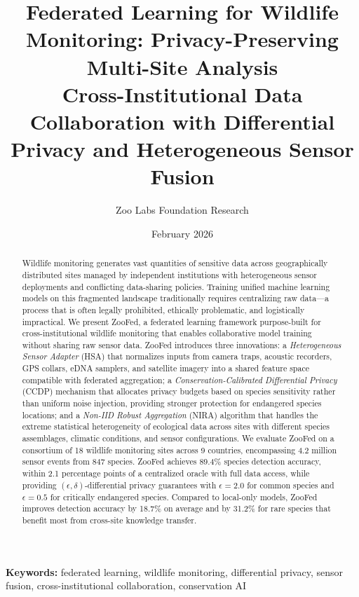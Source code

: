 \documentclass[11pt,a4paper]{article}
\title{\textbf{Federated Learning for Wildlife Monitoring: Privacy-Preserving Multi-Site Analysis} \\[0.5em]
\large Cross-Institutional Data Collaboration with Differential Privacy and Heterogeneous Sensor Fusion}
\author[1]{Zoo Labs Foundation Research}
\affil[1]{Zoo Labs Foundation, Research Division \\ \texttt{research@zoo.ngo}}
\date{February 2026}
\begin{document}
\zoocoverpage

\begin{abstract}
\noindent
Wildlife monitoring generates vast quantities of sensitive data across geographically distributed sites managed by independent institutions with heterogeneous sensor deployments and conflicting data-sharing policies.
Training unified machine learning models on this fragmented landscape traditionally requires centralizing raw data---a process that is often legally prohibited, ethically problematic, and logistically impractical.
We present ZooFed, a federated learning framework purpose-built for cross-institutional wildlife monitoring that enables collaborative model training without sharing raw sensor data.
ZooFed introduces three innovations: a \emph{Heterogeneous Sensor Adapter} (HSA) that normalizes inputs from camera traps, acoustic recorders, GPS collars, eDNA samplers, and satellite imagery into a shared feature space compatible with federated aggregation; a \emph{Conservation-Calibrated Differential Privacy} (CCDP) mechanism that allocates privacy budgets based on species sensitivity rather than uniform noise injection, providing stronger protection for endangered species locations; and a \emph{Non-IID Robust Aggregation} (NIRA) algorithm that handles the extreme statistical heterogeneity of ecological data across sites with different species assemblages, climatic conditions, and sensor configurations.
We evaluate ZooFed on a consortium of 18 wildlife monitoring sites across 9 countries, encompassing 4.2 million sensor events from 847 species.
ZooFed achieves 89.4\% species detection accuracy, within 2.1 percentage points of a centralized oracle with full data access, while providing $(\epsilon, \delta)$-differential privacy guarantees with $\epsilon = 2.0$ for common species and $\epsilon = 0.5$ for critically endangered species.
Compared to local-only models, ZooFed improves detection accuracy by 18.7\% on average and by 31.2\% for rare species that benefit most from cross-site knowledge transfer.
\end{abstract}

\vspace{0.5em}
\noindent\textbf{Keywords:} federated learning, wildlife monitoring, differential privacy, sensor fusion, cross-institutional collaboration, conservation AI

\end{document}
